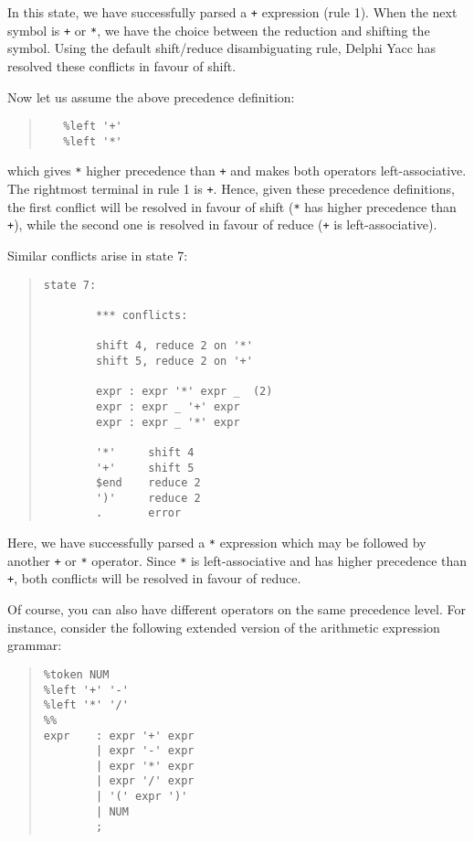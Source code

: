 \documentclass{article}
\begin{document}
In this state, we have successfully parsed a \verb"+" expression (rule 1).
When the next symbol is \verb"+" or \verb"*", we have the choice between the
reduction and shifting the symbol. Using the default shift/reduce
disambiguating rule, Delphi Yacc has resolved these conflicts in favour of shift.

Now let us assume the above precedence definition:
\begin{quote}\begin{verbatim}
   %left '+'
   %left '*'
\end{verbatim}\end{quote}
which gives \verb"*" higher precedence than \verb"+" and makes both operators
left-associative. The rightmost terminal in rule 1 is \verb"+". Hence, given
these precedence definitions, the first conflict will be resolved in favour
of shift (\verb"*" has higher precedence than \verb"+"), while the second one
is resolved in favour of reduce (\verb"+" is left-associative).

Similar conflicts arise in state 7:

\begin{quote}\begin{verbatim}
state 7:

        *** conflicts:

        shift 4, reduce 2 on '*'
        shift 5, reduce 2 on '+'

        expr : expr '*' expr _  (2)
        expr : expr _ '+' expr
        expr : expr _ '*' expr

        '*'     shift 4
        '+'     shift 5
        $end    reduce 2
        ')'     reduce 2
        .       error
\end{verbatim}\end{quote}

Here, we have successfully parsed a \verb"*" expression which may be followed
by another \verb"+" or \verb"*" operator. Since \verb"*" is left-associative
and has higher precedence than \verb"+", both conflicts will be resolved in
favour of reduce.

Of course, you can also have different operators on the same precedence
level. For instance, consider the following extended version of the
arithmetic expression grammar:

\begin{quote}\begin{verbatim}
%token NUM
%left '+' '-'
%left '*' '/'
%%
expr    : expr '+' expr
        | expr '-' expr
        | expr '*' expr
        | expr '/' expr
        | '(' expr ')'
        | NUM
        ;
\end{verbatim}\end{quote}
\end{document}
